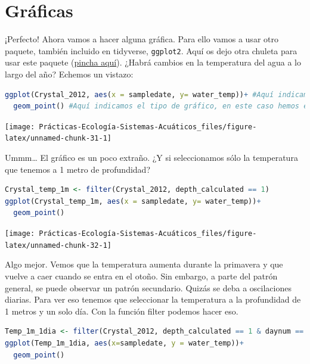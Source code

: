 \documentclass[
]{book}
\newcommand{\passthrough}[1]{#1}
\begin{document}
\hypertarget{gruxe1ficas}{%
\section{Gráficas}\label{gruxe1ficas}}

¡Perfecto! Ahora vamos a hacer alguna gráfica. Para ello vamos a usar otro paquete, también incluido en tidyverse, \passthrough{\lstinline!ggplot2!}. Aquí os dejo otra chuleta para usar este paquete (\href{https://raw.githubusercontent.com/rstudio/cheatsheets/master/data-visualization-2.1.pdf}{pincha aquí}). ¿Habrá cambios en la temperatura del agua a lo largo del año? Echemos un vistazo:

\begin{lstlisting}[language=R]
ggplot(Crystal_2012, aes(x = sampledate, y= water_temp))+ #Aquí indicamos donde está la información que queremos representar (Crystal_2012) y que variables x e y
  geom_point() #Aquí indicamos el tipo de gráfico, en este caso hemos elegido puntos
\end{lstlisting}

\texttt{[image: Prácticas-Ecología-Sistemas-Acuáticos\_files/figure-latex/unnamed-chunk-31-1]}

Ummm\ldots{} El gráfico es un poco extraño. ¿Y si seleccionamos sólo la temperatura que tenemos a 1 metro de profundidad?

\begin{lstlisting}[language=R]
Crystal_temp_1m <- filter(Crystal_2012, depth_calculated == 1)
ggplot(Crystal_temp_1m, aes(x = sampledate, y= water_temp))+
  geom_point()
\end{lstlisting}

\texttt{[image: Prácticas-Ecología-Sistemas-Acuáticos\_files/figure-latex/unnamed-chunk-32-1]}

Algo mejor. Vemos que la temperatura aumenta durante la primavera y que vuelve a caer cuando se entra en el otoño. Sin embargo, a parte del patrón general, se puede observar un patrón secundario. Quizás se deba a oscilaciones diarias. Para ver eso tenemos que seleccionar la temperatura a la profundidad de 1 metros y un solo día. Con la función filter podemos hacer eso.

\begin{lstlisting}[language=R]
Temp_1m_1dia <- filter(Crystal_2012, depth_calculated == 1 & daynum == 260) #Yo he elegido el día 260 (16 de septiembre)
ggplot(Temp_1m_1dia, aes(x=sampledate, y = water_temp))+
  geom_point()
\end{lstlisting}
\end{document}
